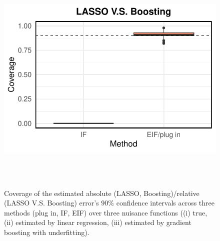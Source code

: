 \documentclass[twoside]{article}
\newcommand{\1}{{\mathbbm{1}}}
\begin{document}
\begin{figure}[ht]
\begin{minipage}{0.15\textwidth}
                \includegraphics[clip, trim = 0cm 0cm 0cm 0cm, width = \textwidth]{plot/simulation_gradient_boosting_coverage_LASSO_V.S._Boosting.pdf}
        \end{minipage}        
        \\\\
        \caption{ 
        \small
        Coverage of the estimated absolute (LASSO, Boosting)/relative (LASSO V.S. Boosting) error's $90\%$ confidence intervals across three methods (plug in, IF, EIF) over three nuisance functions ((i) true, (ii) estimated by linear regression, (iii) estimated by gradient boosting with underfitting).
        }
    \label{fig:simulation.coverage}
\end{figure}

\end{document}
